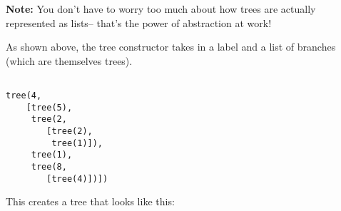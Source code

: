 \textbf{Note:} You don't have to worry too much about how trees are actually represented as lists-- that's the power of abstraction at work!

As shown above, the tree constructor takes in a label and a list of branches (which are themselves trees).

\begin{lstlisting}

tree(4,
    [tree(5),
     tree(2,
        [tree(2),
         tree(1)]),
     tree(1),
     tree(8,
        [tree(4)])])
\end{lstlisting}

This creates a tree that looks like this:

